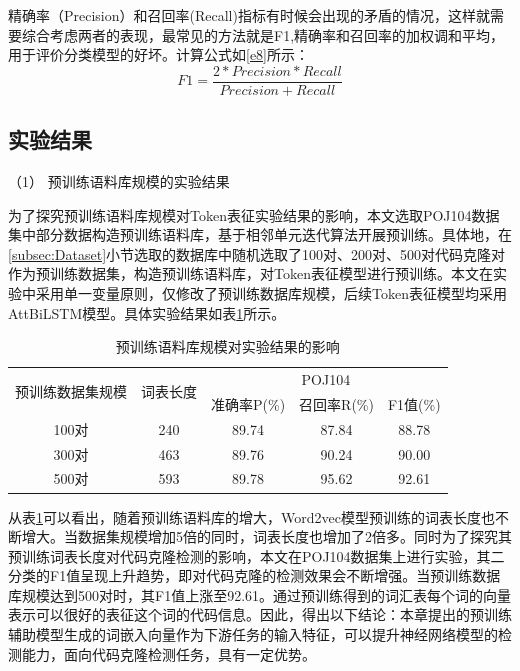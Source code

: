 精确率（Precision）和召回率(Recall)指标有时候会出现的矛盾的情况，这样就需要综合考虑两者的表现，最常见的方法就是F1,精确率和召回率的加权调和平均，用于评价分类模型的好坏。计算公式如\ref{e8}所示：
\begin{equation}\label{e8}
  F1 = \frac{2*Precision*Recall}{Precision+Recall} 
\end{equation}

\subsection{实验结果}
\label{subsec:TokenResult}
（1） 预训练语料库规模的实验结果

为了探究预训练语料库规模对Token表征实验结果的影响，本文选取POJ104数据集中部分数据构造预训练语料库，基于相邻单元迭代算法开展预训练。具体地，在\ref{subsec:Dataset}小节选取的数据库中随机选取了100对、200对、500对代码克隆对作为预训练数据集，构造预训练语料库，对Token表征模型进行预训练。本文在实验中采用单一变量原则，仅修改了预训练数据库规模，后续Token表征模型均采用AttBiLSTM模型。具体实验结果如表\ref{tab:category}所示。

\begin{table}[htp]
  \centering  
  \caption{预训练语料库规模对实验结果的影响}   
  \label{tab:category}  
  \begin{tabular*}{0.9\textwidth}{@{\extracolsep{\fill}}ccccc}  
  \toprule
  \multirow{2}{*}{预训练数据集规模} & \multirow{2}{*}{词表长度} & \multicolumn{3}{c}{POJ104} \\
  \cmidrule{3-5} 
   & & 准确率P(\%) & 召回率R(\%) & F1值(\%)  \\  
  \midrule 
  100对	&240		& 89.74	& 87.84	& 88.78		 \\  
  300对	&463		& 89.76	& 90.24	& 90.00	 \\  
  500对	&593 	  & 89.78	& 95.62	& 92.61	   \\  
  \bottomrule  
  \end{tabular*}  
\end{table}

从表\ref{tab:category}可以看出，随着预训练语料库的增大，Word2vec模型预训练的词表长度也不断增大。当数据集规模增加5倍的同时，词表长度也增加了2倍多。同时为了探究其预训练词表长度对代码克隆检测的影响，本文在POJ104数据集上进行实验，其二分类的F1值呈现上升趋势，即对代码克隆的检测效果会不断增强。当预训练数据库规模达到500对时，其F1值上涨至92.61。通过预训练得到的词汇表每个词的向量表示可以很好的表征这个词的代码信息。因此，得出以下结论：本章提出的预训练辅助模型生成的词嵌入向量作为下游任务的输入特征，可以提升神经网络模型的检测能力，面向代码克隆检测任务，具有一定优势。

